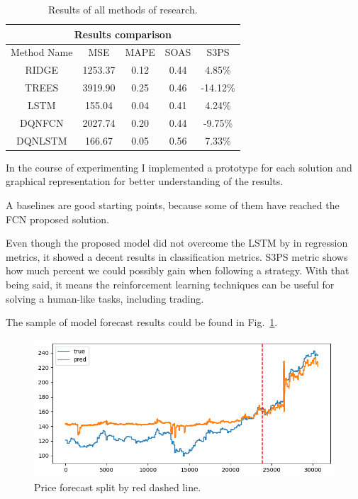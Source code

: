 \documentclass{article}
\begin{document}
\begin{table}[tbh!]
\begin{center}
\begin{tabular}{ |c||c|c|c|c|  }
 \hline
 \multicolumn{5}{|c|}{Results comparison} \\
 \hline
 Method Name & MSE & MAPE & SOAS & S3PS \\
 \hline
 \hline
 RIDGE & 1253.37 & 0.12 & 0.44 & 4.85\% \\
 \hline
 TREES & 3919.90 & 0.25 & 0.46 & -14.12\% \\
 \hline
 LSTM & 155.04 & 0.04 & 0.41 & 4.24\% \\
 \hline
 DQNFCN & 2027.74 & 0.20 & 0.44 & -9.75\% \\
 \hline
 DQNLSTM & 166.67 & 0.05 & 0.56 &  7.33\% \\
 \hline
\end{tabular}
\caption{Results of all methods of research.}
\label{tab:results}
\end{center}
\end{table}

In the course of experimenting I implemented a prototype for each solution and graphical representation for better understanding of the results.

A baselines are good starting points, because some of them have reached the FCN proposed solution.

Even though the proposed model did not overcome the LSTM by \newline \cite{Sen_2021} in regression metrics, it showed a decent results in classification metrics.
S3PS metric shows how much percent we could possibly gain when following a strategy. 
With that being said, it means the reinforcement learning techniques can be useful for solving a human-like tasks, including trading.

The sample of model forecast results could be found in Fig.~\ref{fig:forecasts}.

\begin{figure}[!tbh]
    \centering
    \includegraphics[width=0.9\linewidth]{forecasts.png}
    \caption{Price forecast split by red dashed line.}
    \label{fig:forecasts}
\end{figure}
\end{document}
